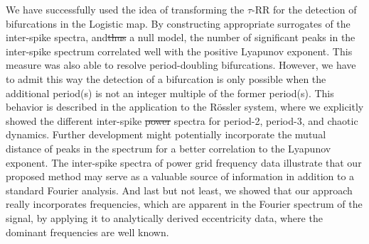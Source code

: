 \documentclass[entropy,article,submit,pdftex,moreauthors]{Definitions/mdpi}
\providecommand{\DIFadd}[1]{{\protect\color{blue}\uwave{#1}}} %
\providecommand{\DIFdel}[1]{{\protect\color{red}\sout{#1}}}                      %
\providecommand{\DIFaddbegin}{} %
\providecommand{\DIFaddend}{} %
\providecommand{\DIFdelbegin}{} %
\providecommand{\DIFdelend}{} %
\begin{document}
We have successfully used the idea of transforming the $\tau$-RR for the detection of bifurcations in the Logistic map. By constructing appropriate surrogates of the inter-spike spectra, 
and\DIFdelbegin \DIFdel{thus }\DIFdelend \DIFaddbegin \DIFadd{, thus, }\DIFaddend a null model, the number of significant peaks in the inter-spike spectrum correlated well with the positive Lyapunov exponent. This measure was also able to resolve 
period-doubling bifurcations. However, we have to admit this way the detection of a bifurcation is only possible when the additional period(s) is not an integer multiple of the former period(s). 
This behavior is described in the application to the R\"ossler system, where we explicitly showed the different inter-spike \DIFdelbegin \DIFdel{power }\DIFdelend spectra for period-2, period-3, and chaotic dynamics.
Further development might potentially incorporate the mutual distance of peaks in the spectrum for a better correlation to the Lyapunov exponent. The inter-spike spectra of power grid 
frequency data illustrate that our proposed method may serve as a valuable source of information in addition to a standard Fourier analysis. And last but not least, we showed that our approach 
really incorporates frequencies, which are apparent in the Fourier spectrum of the signal, by applying it to analytically derived eccentricity data, where the dominant frequencies are well 
known.
\end{document}
